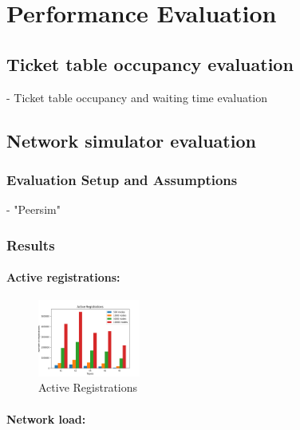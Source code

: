 
\section{Performance Evaluation}\label{sec:eval}

\subsection{Ticket table occupancy evaluation}

- Ticket table occupancy  and waiting time evaluation

\subsection{Network simulator evaluation}

\subsubsection{Evaluation Setup and Assumptions}

- "Peersim"~\cite{p2p09-peersim}


\subsubsection{Results}

\paragraph{\bf{Active registrations}:}

\begin{figure}[h!]
\centering
\includegraphics[width=0.3\textwidth]{img/eval/registration_origin.png}
\caption{Active Registrations}
\label{fig:regs}
\vspace{-0.15in}
\end{figure}

\paragraph{\bf{Network load}:}


